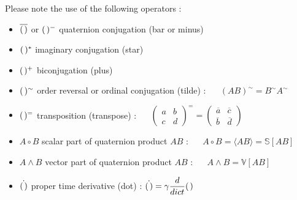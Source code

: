 \documentclass [12pt,a4paper      ]{article}
\newcommand{\CON}{\overline}          %
\newcommand{\Scal}{\mathbb{S}}        %
\newcommand{\Vect}{\mathbb{V}}        %
\newcommand{\scal}{\circ}             %
\newcommand{\vect}{\wedge}            %
\newcommand{\SCA}{\langle}            %
\newcommand{\LAR}{\rangle}            %
\newcommand{\A}{(\hspace{.5mm})} %
\newcommand{\REV}{\sim}               %
\begin{document}
\noindent Please note the use of the following operators :
\begin{itemize}
\item $\CON{\A}$ or $\A^-$  quaternion conjugation (bar or minus)
\item $\A^*$        imaginary  conjugation (star)
\item $\A^+$                 biconjugation (plus)
\item $\A^\REV$ order reversal or ordinal conjugation (tilde) : ~~ $(AB)^\REV = B^\REV A^\REV$
\item $\A^=$  transposition (transpose) : ~~ $\begin{pmatrix} a & b \\ c & d \end{pmatrix}^= = 
\begin{pmatrix} \CON{a} & \CON{c} \\ \CON{b} & \CON{d} \end{pmatrix}$
\item $A \scal B$        scalar part of quaternion product $AB$ : ~~ $A \scal B = \SCA A B \LAR = \Scal[AB]$
\item $A \vect B$        vector part of quaternion product $AB$ : ~~ $A\vect B = \Vect[AB]$
\item $\dot{\A}$       proper time derivative (dot) :  $\dot{\A} = \gamma \dfrac{d}{dict}\A$
\end{itemize}
\end{document}
